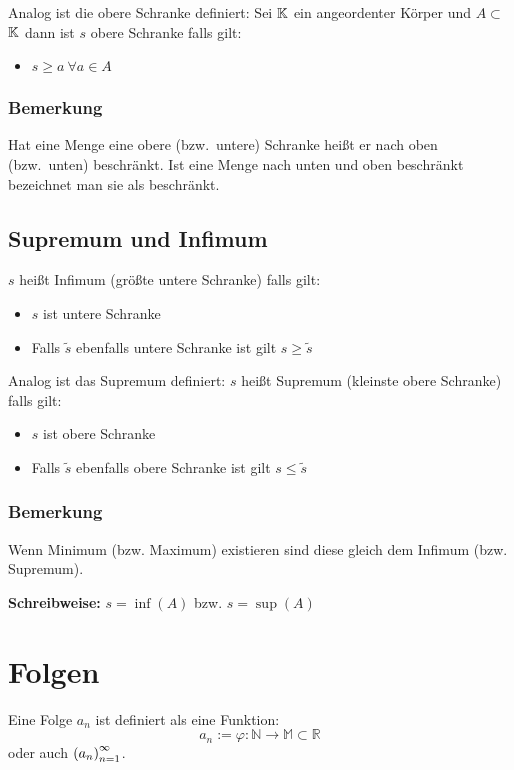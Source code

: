  Analog ist die obere Schranke definiert:
Sei $\mathbb{K}$ ein angeordenter Körper und $A \subset$ $\mathbb{K}$ dann ist $s$ obere
Schranke falls gilt:
\begin{itemize}
    \item $s \geq a\ \forall a \in A$
\end{itemize}

\subsubsection{Bemerkung} Hat eine Menge eine obere (bzw.\ untere) Schranke
heißt er nach oben (bzw.\ unten) beschränkt. Ist eine Menge nach unten und
oben beschränkt bezeichnet man sie als beschränkt.

\subsection{Supremum und Infimum}
$s$ heißt Infimum (größte untere Schranke) falls gilt:
\begin{itemize}
    \item $s$ ist untere Schranke
    \item Falls $\tilde{s}$ ebenfalls untere Schranke ist gilt
    $s\geq\tilde{s}$
\end{itemize}

 Analog ist das Supremum definiert: $s$ heißt Supremum (kleinste obere Schranke) falls gilt:
\begin{itemize}
    \item $s$ ist obere Schranke
    \item Falls $\tilde{s}$ ebenfalls obere Schranke ist gilt
    $s\leq\tilde{s}$
\end{itemize}

\subsubsection{Bemerkung}
Wenn Minimum (bzw. Maximum) existieren sind diese gleich dem
Infimum (bzw. Supremum).

\textbf{Schreibweise:}
$s = \inf{(A)}$ bzw. $s = \sup{(A)}$


\section{Folgen}
Eine Folge $a_n$ ist definiert als eine Funktion:
\begin{equation*}
    a_n := \varphi: \mathbb{N} \rightarrow \mathbb{M} \subset \mathbb{R}
\end{equation*}
oder auch ${(a_n)}_{n=1}^\infty$.

